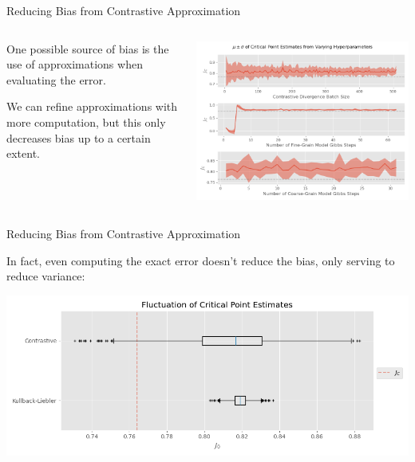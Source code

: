 \documentclass[aspectratio=169, 12pt]{beamer}
\begin{document}
\begin{frame}{Reducing Bias from Contrastive Approximation}

    \begin{columns}
        \begin{column}{.4\textwidth}
            
            One possible source of bias is the use of approximations when evaluating the error. 

            \vspace{1em}
        
            We can refine approximations with more computation, but this only decreases bias up to a certain extent. 
            
        \end{column}
        \begin{column}{.6\textwidth}
            \includegraphics[width=\textwidth]{images/cd-hyperparameters.png}
        \end{column}
    \end{columns}

\end{frame}

\begin{frame}{Reducing Bias from Contrastive Approximation}

    In fact, even computing the exact error doesn't reduce the bias, only serving to reduce variance:

    \begin{center}
        \includegraphics[width=\textwidth]{images/a1_critical_points_divergence_boxplot.png}
    \end{center}

\end{frame}
\end{document}
